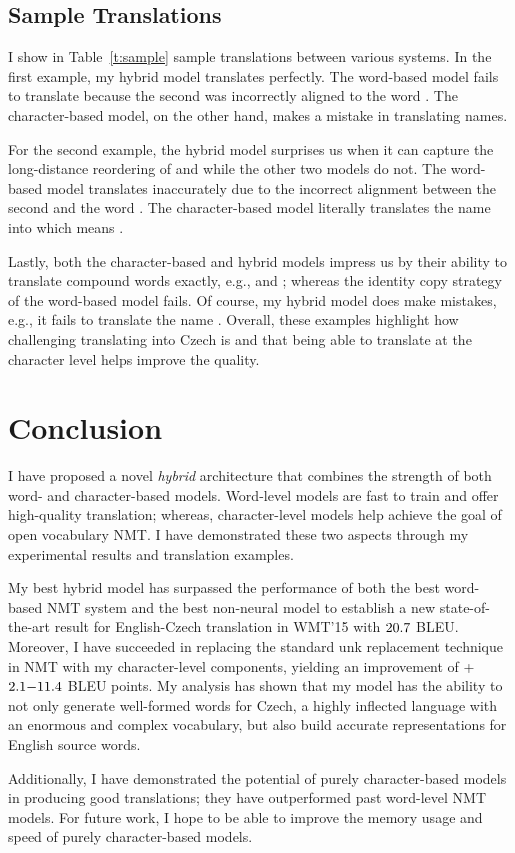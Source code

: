 \subsection{Sample Translations}
\label{subsec:samples}

I show in Table~\ref{t:sample} sample translations between various systems. 
In the first example, my hybrid model translates perfectly. The word-based
model fails to translate  because the second \unk{} was incorrectly
aligned to the word . The character-based model, on the other hand,
makes a mistake in translating names.

For the second example, the hybrid model surprises us when it can capture
the long-distance reordering of  and  while the other two models do not. The word-based model
translates  inaccurately due to the incorrect alignment between the
second \unk{} and the word . The
character-based model literally translates the name  into 
which means .

Lastly, both the character-based and hybrid models impress us by
their ability to translate compound words exactly, e.g.,  and
; whereas the identity copy
strategy of the word-based model fails.
Of course, my hybrid model does make mistakes, e.g., it fails to translate the name
. 
Overall, these examples highlight how challenging translating
into Czech is and that being able to translate at the character level helps
improve the quality.

\section{Conclusion}
\label{sec:conclude}
I have proposed a novel {\it hybrid} architecture that combines the strength
of both word- and character-based models. Word-level models are fast to train
and offer high-quality translation; whereas, character-level models help achieve
the goal of open vocabulary NMT. 
I have demonstrated these two aspects through my experimental results and
translation examples.

My best hybrid model has surpassed the performance of both the best word-based
NMT system and the best non-neural model to establish a new state-of-the-art result for 
English-Czech translation in WMT'15 with $20.7{}$ BLEU.
Moreover, I have succeeded in replacing the standard unk replacement technique
in NMT with my character-level components, yielding an improvement of 
+$2.1{-}11.4{}$ BLEU points. My analysis has shown that my model has the ability to
not only generate well-formed words for
Czech, a highly inflected language with an enormous and complex vocabulary, but
also build accurate representations for English source words.

Additionally, I have demonstrated the potential of purely character-based
models in producing good translations;
they have outperformed past word-level NMT models. For future work, I hope to be able to improve the memory usage and
speed of purely character-based models.


